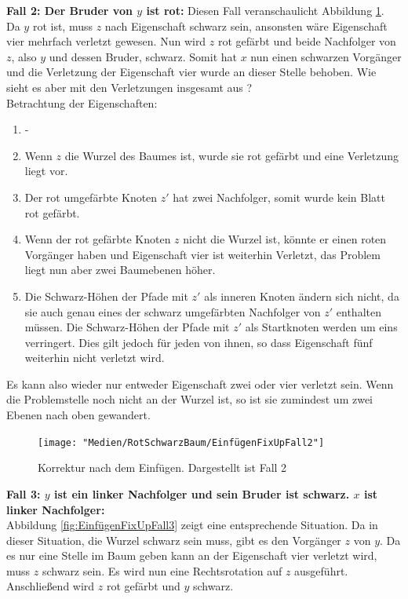 \documentclass[a4paper,12pt]{article}
\begin{document}
\noindent\textbf{Fall 2: Der Bruder von $y$ ist rot: }
\noindent Diesen Fall veranschaulicht Abbildung \ref{fig:EinfügenFixUpFall2}. Da $y$ rot ist, muss $z$ nach Eigenschaft schwarz sein, ansonsten wäre Eigenschaft vier mehrfach verletzt gewesen. Nun wird $z$ rot gefärbt und beide Nachfolger von $z$, also $y$ und dessen Bruder, schwarz. Somit hat $x$ nun einen schwarzen Vorgänger und die Verletzung der Eigenschaft vier wurde an dieser Stelle behoben. Wie sieht es aber mit den Verletzungen insgesamt aus ? \\

Betrachtung der Eigenschaften:

\begin{enumerate}
	\item -
	\item Wenn $z$ die Wurzel des Baumes ist, wurde sie rot gefärbt und eine Verletzung liegt vor.
	\item Der rot umgefärbte Knoten $z'$ hat zwei Nachfolger, somit wurde kein Blatt rot gefärbt.
	\item  Wenn der rot gefärbte Knoten $z$ nicht die Wurzel ist, könnte er einen roten Vorgänger haben und Eigenschaft vier ist weiterhin Verletzt, das Problem liegt nun aber zwei Baumebenen höher.
	\item  Die Schwarz-Höhen der Pfade mit $z'$ als inneren Knoten ändern sich nicht, da sie auch genau eines der schwarz umgefärbten Nachfolger von $z'$ enthalten müssen. Die Schwarz-Höhen der Pfade mit $z'$ als Startknoten werden um eins verringert. Dies gilt jedoch für jeden von ihnen, so dass Eigenschaft fünf weiterhin nicht verletzt wird.
\end{enumerate} 
Es kann also wieder nur entweder Eigenschaft zwei oder vier verletzt sein. Wenn die Problemstelle noch nicht an der Wurzel ist, so ist sie zumindest um zwei Ebenen nach oben gewandert. 
\begin{figure}[h]
	\centering
	\texttt{[image: "Medien/RotSchwarzBaum/EinfügenFixUpFall2"]}
	\caption{Korrektur nach dem Einfügen. Dargestellt ist Fall 2  }
	\label{fig:EinfügenFixUpFall2}
\end{figure}

\noindent\textbf{Fall 3: $y$ ist ein linker Nachfolger und sein Bruder ist schwarz. $x$ ist linker Nachfolger: }\\
\noindent Abbildung \ref{fig:EinfügenFixUpFall3} zeigt eine entsprechende Situation. Da in dieser Situation, die Wurzel schwarz sein muss, gibt es den Vorgänger $z$ von $y$. Da es nur eine Stelle im Baum geben kann an der Eigenschaft vier verletzt wird, muss $z$ schwarz sein. Es wird nun eine Rechtsrotation auf $z$ ausgeführt. Anschließend wird $z$ rot gefärbt und $y$ schwarz. \\
\end{document}
